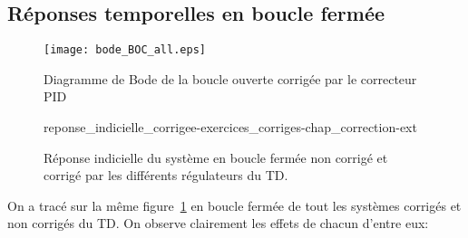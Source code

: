 \subsection*{Réponses temporelles en boucle fermée}

\begin{figure}[!h]
    \centering
    \texttt{[image: bode\_BOC\_all.eps]}
    \caption{Diagramme de Bode de la boucle ouverte corrigée par 
    le correcteur PID}
\end{figure}
\clearpage
\begin{figure}
\centering
{}
{reponse_indicielle_corrigee-exercices_corriges-chap_correction-ext}

\caption{Réponse indicielle du système en boucle fermée non corrigé 
         et corrigé par les différents régulateurs 
         du TD.~\label{fig-reponses_indicielles}}
\end{figure}
On a tracé sur la même figure~\ref{fig-reponses_indicielles} en boucle fermée 
de tout les systèmes corrigés et non corrigés du TD. On observe clairement les
effets de chacun d'entre eux:
